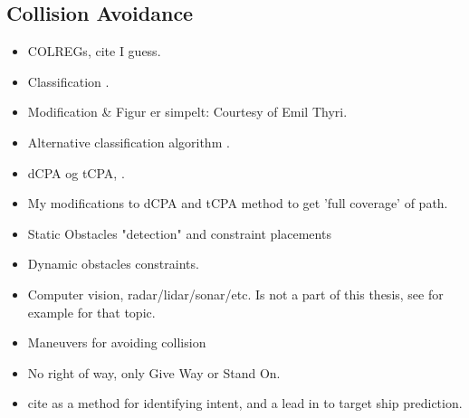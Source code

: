 



\subsection{Collision Avoidance}

\begin{itemize}
    \item \gls{COLREGs}, cite \cite{WikisourceCOLREGS} I guess.
    \item Classification \cite{tam2010collision}.
    \item Modification \& Figur er simpelt: Courtesy of Emil Thyri.
    \item Alternative classification algorithm \cite{woerner2016multi}.
    \item dCPA og tCPA, \cite{Kufoalor2018}.
    \item My modifications to dCPA and tCPA method to get 'full coverage' of path.
    \item Static Obstacles "detection" and constraint placements
    \item Dynamic obstacles constraints.
    \item Computer vision, radar/lidar/sonar/etc. Is not a part of this thesis, see for example \cite{ruud2018lidar} for that topic.
    \item Maneuvers for avoiding collision \cite{cockcroft2012manoeuvres}
    \item No right of way, only Give Way or Stand On.
    \item cite \cite{cho2018intent} as a method for identifying intent, and a lead in to target ship prediction.
\end{itemize}

